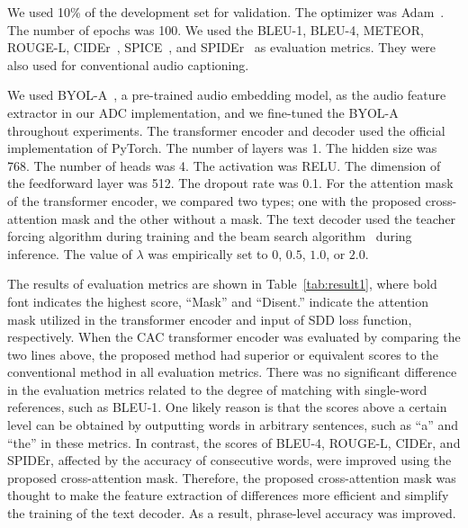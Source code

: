 We used 10\% of the development set for validation.
The optimizer was Adam~\cite{kingma2014adam}.
The number of epochs was 100.
We used the BLEU-1, BLEU-4, METEOR, ROUGE-L, CIDEr~\cite{vedantam2015cider}, SPICE~\cite{anderson2016spice}, and SPIDEr~\cite{liu2017improved} as evaluation metrics.
They were also used for conventional audio captioning\cite{dcase2022task6}.

We used BYOL-A~\cite{niizumi2021byol-a}, a pre-trained audio embedding model, as the audio feature extractor in our ADC implementation, and we fine-tuned the BYOL-A throughout experiments.
The transformer encoder and decoder used the official implementation of PyTorch. 
The number of layers was 1. The hidden size was 768. The number of heads was 4. The activation was RELU. The dimension of the feedforward layer was 512. The dropout rate was 0.1.
For the attention mask of the transformer encoder, we compared two types; one with the proposed cross-attention mask and the other without a mask.
The text decoder used the teacher forcing algorithm during training and the beam search algorithm~\cite{koehn2009statistical, koehn2004pharaoh} during inference.
The value of $\lambda$ was empirically set to $0$, $0.5$, $1.0$, or $2.0$. 

The results of evaluation metrics are shown in Table~\ref{tab:result1}, where bold font indicates the highest score, ``Mask'' and ``Disent.'' indicate the attention mask utilized in the transformer encoder and input of SDD loss function, respectively.
When the CAC transformer encoder was evaluated by comparing the two lines above, the proposed method had superior or equivalent scores to the conventional method in all evaluation metrics.
There was no significant difference in the evaluation metrics related to the degree of matching with single-word references, such as BLEU-1.
One likely reason is that the scores above a certain level can be obtained by outputting words in arbitrary sentences, such as ``a'' and ``the'' in these metrics. In contrast, the scores of BLEU-4, ROUGE-L, CIDEr, and SPIDEr, affected by the accuracy of consecutive words, were improved using the proposed cross-attention mask. Therefore, the proposed cross-attention mask was thought to make the feature extraction of differences more efficient and simplify the training of the text decoder. As a result, phrase-level accuracy was improved.

